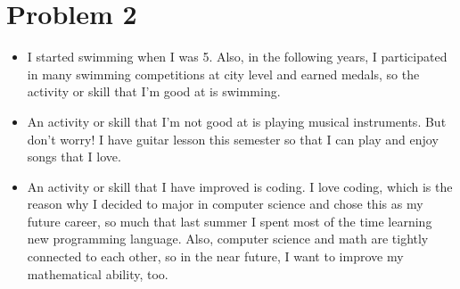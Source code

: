 \documentclass[10pt]{article}
\begin{document}
\section*{Problem 2}
\begin{itemize}
    \item I started swimming when I was 5. Also, in the following years, I participated in many swimming competitions at city level and earned medals, so the activity or skill that I'm good at is swimming.
    \item An activity or skill that I'm not good at is playing musical instruments. But don't worry! I have guitar lesson this semester so that I can play and enjoy songs that I love.
    \item An activity or skill that I have improved is coding. I love coding, which is the reason why I decided to major in computer science and chose this as my future career, so much that last summer I spent most of the time learning new programming language. Also, computer science and math are tightly connected to each other, so in the near future, I want to improve my mathematical ability, too.
\end{itemize}
\end{document}
